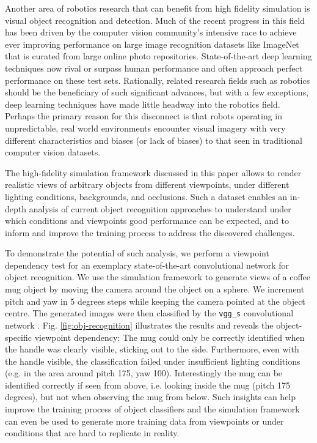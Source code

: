 \documentclass[letterpaper, 10 pt, conference]{ieeeconf}  %
\begin{document}
Another area of robotics research that can benefit from high fidelity simulation is visual object recognition and detection.
Much of the recent progress in this field has been driven by the computer vision community's intensive race to achieve ever improving performance on large image recognition datasets like ImageNet \cite{Russakovsky14} that is curated from large online photo repositories. State-of-the-art deep learning techniques now rival or surpass human performance and often approach perfect performance on these test sets. Rationally, related research fields such as robotics should be the beneficiary of such significant advances, but with a few exceptions, deep learning techniques have made little headway into the robotics field. Perhaps the primary reason for this disconnect is that robots operating in unpredictable, real world environments encounter visual imagery with very different characteristics and biases (or lack of biases) to that seen in traditional computer vision datasets. 


The high-fidelity simulation framework discussed in this paper allows to render realistic views of arbitrary objects from different viewpoints, under different lighting conditions, backgrounds, and occlusions. Such a dataset enables an in-depth analysis of current object recognition approaches to understand under which conditions and viewpoints good performance can be expected, and to inform and improve the training process to address the discovered challenges.

To demonstrate the potential of such analysis, we perform a viewpoint dependency test for an exemplary state-of-the-art convolutional network for object recognition. We use the simulation framework to generate views of a coffee mug object by moving the camera around the object on a sphere. We increment pitch and yaw in 5 degrees steps while keeping the camera pointed at the object centre. The generated images were then classified by the \texttt{vgg\_s} convolutional network \cite{Chatfield14}. Fig. \ref{fig:obj-recognition} illustrates the results and reveals the object-specific viewpoint dependency: The mug could only be correctly identified when the handle was clearly visible, sticking out to the side. Furthermore, even with the handle visible, the classification failed under insufficient lighting conditions (e.g. in the area around pitch 175, yaw 100). Interestingly the mug can be identified correctly if seen from above, i.e. looking inside the mug (pitch 175 degrees), but not when observing the mug from below. Such insights can help improve the training process of object classifiers and the simulation framework can even be used to generate more training data from viewpoints or under conditions that are hard to replicate in reality.
\end{document}
